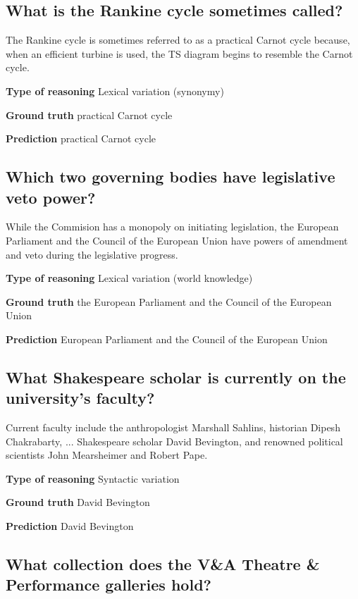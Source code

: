 \documentclass{article} \usepackage{iclr2017_conference,times}
\begin{document}
\subsection*{What is the Rankine cycle sometimes called?}

The Rankine cycle is sometimes referred to as a practical Carnot cycle because, when an efficient turbine is used, the TS diagram begins to resemble the Carnot cycle.

\textbf{Type of reasoning}
Lexical variation (synonymy)

\textbf{Ground truth}
practical Carnot cycle

\textbf{Prediction}
practical Carnot cycle


\subsection*{Which two governing bodies have legislative veto power?}

While the Commision has a monopoly on initiating legislation, the European Parliament and the Council of the European Union have powers of amendment and veto during the legislative progress.

\textbf{Type of reasoning}
Lexical variation (world knowledge)

\textbf{Ground truth}
the European Parliament and the Council of the European Union

\textbf{Prediction}
European Parliament and the Council of the European Union


\subsection*{What Shakespeare scholar is currently on the university’s faculty?}

Current faculty include the anthropologist Marshall Sahlins, historian Dipesh Chakrabarty, ... Shakespeare scholar David Bevington, and renowned political scientists John Mearsheimer and Robert Pape.

\textbf{Type of reasoning}
Syntactic variation

\textbf{Ground truth}
David Bevington

\textbf{Prediction}
David Bevington


\subsection*{What collection does the V\&A Theatre \& Performance galleries hold?}
\end{document}
